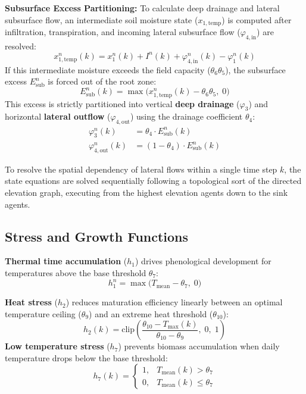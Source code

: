 \textbf{Subsurface Excess Partitioning:}
To calculate deep drainage and lateral subsurface flow, an intermediate soil moisture state ($x_{1,\text{temp}}$) is computed after infiltration, transpiration, and incoming lateral subsurface flow ($\varphi_{4,\text{in}}$) are resolved:
\begin{equation}
    x_{1,\text{temp}}^n(k) = x_1^n(k) + I^n(k) + \varphi_{4,\text{in}}^n(k) - \varphi_1^n(k)
\end{equation}
If this intermediate moisture exceeds the field capacity ($\theta_6 \theta_5$), the subsurface excess $E_{\text{sub}}^n$ is forced out of the root zone:
\begin{equation}
    E_{\text{sub}}^n(k) = \max\!\big(x_{1,\text{temp}}^n(k) - \theta_6 \theta_5,\; 0\big)
\end{equation}
This excess is strictly partitioned into vertical \textbf{deep drainage} ($\varphi_3$) and horizontal \textbf{lateral outflow} ($\varphi_{4,\text{out}}$) using the drainage coefficient $\theta_4$:
\begin{align}
    \varphi_3^n(k) &= \theta_4 \cdot E_{\text{sub}}^n(k) \label{eq:phi3} \\
    \varphi_{4,\text{out}}^n(k) &= (1 - \theta_4) \cdot E_{\text{sub}}^n(k) \label{eq:phi4out}
\end{align}

To resolve the spatial dependency of lateral flows within a single time step $k$, the state equations are solved sequentially following a topological sort of the directed elevation graph, executing from the highest elevation agents down to the sink agents.

\subsection{Stress and Growth Functions}
\label{sec:stress_growth}

\textbf{Thermal time accumulation} ($h_1$) drives phenological development for temperatures above the base threshold $\theta_7$:
\begin{equation}
    h_1^n = \max\!\bigl(T_{\text{mean}} - \theta_7,\; 0\bigr)
    \label{eq:h1}
\end{equation}

\textbf{Heat stress} ($h_2$) reduces maturation efficiency linearly between an optimal temperature ceiling ($\theta_9$) and an extreme heat threshold ($\theta_{10}$):
\begin{equation}
    h_2(k) = \text{clip}\!\left( \frac{\theta_{10} - T_{\max}(k)}{\theta_{10} - \theta_9},\; 0,\; 1 \right)
\end{equation}
\textbf{Low temperature stress} ($h_7$) prevents biomass accumulation when daily temperature drops below the base threshold:
\begin{equation}
    h_7(k) = \begin{cases} 
      1, & T_{\text{mean}}(k) > \theta_7 \\ 
      0, & T_{\text{mean}}(k) \leq \theta_7 
   \end{cases}
\end{equation}

